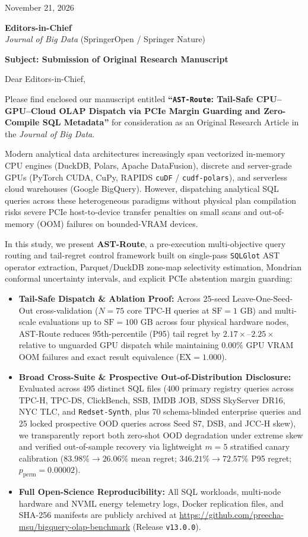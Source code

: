 \documentclass[11pt,a4paper]{article}
\begin{document}
November 21, 2026

\textbf{Editors-in-Chief}\\
\textit{Journal of Big Data} (SpringerOpen / Springer Nature)

\textbf{Subject: Submission of Original Research Manuscript}

Dear Editors-in-Chief,

Please find enclosed our manuscript entitled \textbf{``\texttt{AST-Route}: Tail-Safe CPU--GPU--Cloud OLAP Dispatch via PCIe Margin Guarding and Zero-Compile SQL Metadata''} for consideration as an Original Research Article in the \textit{Journal of Big Data}.

Modern analytical data architectures increasingly span vectorized in-memory CPU engines (DuckDB, Polars, Apache DataFusion), discrete and server-grade GPUs (PyTorch CUDA, CuPy, RAPIDS \texttt{cuDF} / \texttt{cudf-polars}), and serverless cloud warehouses (Google BigQuery). However, dispatching analytical SQL queries across these heterogeneous paradigms without physical plan compilation risks severe PCIe host-to-device transfer penalties on small scans and out-of-memory (OOM) failures on bounded-VRAM devices.

In this study, we present \textbf{AST-Route}, a pre-execution multi-objective query routing and tail-regret control framework built on single-pass \texttt{SQLGlot} AST operator extraction, Parquet/DuckDB zone-map selectivity estimation, Mondrian conformal uncertainty intervals, and explicit PCIe abstention margin guarding:
\begin{itemize}
  \item \textbf{Tail-Safe Dispatch \& Ablation Proof:} Across 25-seed Leave-One-Seed-Out cross-validation ($N=75$ core TPC-H queries at $\mathrm{SF}=1\text{ GB}$) and multi-scale evaluations up to $\mathrm{SF}=100\text{ GB}$ across four physical hardware nodes, AST-Route reduces 95th-percentile (P95) tail regret by $2.17\times\text{--}2.25\times$ relative to unguarded GPU dispatch while maintaining $0.00\%$ GPU VRAM OOM failures and exact result equivalence ($\mathrm{EX}=1.000$).
  \item \textbf{Broad Cross-Suite \& Prospective Out-of-Distribution Disclosure:} Evaluated across 495 distinct SQL files (400 primary registry queries across TPC-H, TPC-DS, ClickBench, SSB, IMDB JOB, SDSS SkyServer DR16, NYC TLC, and \texttt{Redset-Synth}, plus 70 schema-blinded enterprise queries and 25 locked prospective OOD queries across Seed S7, DSB, and JCC-H skew), we transparently report both zero-shot OOD degradation under extreme skew and verified out-of-sample recovery via lightweight $m=5$ stratified canary calibration ($83.98\% \rightarrow 26.06\%$ mean regret; $346.21\% \rightarrow 72.57\%$ P95 regret; $p_{\mathrm{perm}}=0.00002$).
  \item \textbf{Full Open-Science Reproducibility:} All SQL workloads, multi-node hardware and NVML energy telemetry logs, Docker replication files, and SHA-256 manifests are publicly archived at \url{https://github.com/preecha-msu/bigquery-olap-benchmark} (Release \texttt{v13.0.0}).
\end{itemize}
\end{document}
